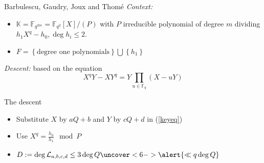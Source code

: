 \documentclass[xcolor=x11names,compress]{beamer}
\theoremstyle{break}
\theoremstyle{sc}
\theoremstyle{definition}
\theoremstyle{remark}
\begin{document}
\begin{frame}{Barbulescu, Gaudry, Joux and Thomé}
  \emph{Context:}
  \begin{itemize}
    \item $\mathbb{K}=\mathbb{F}_{q^{2m}}=\mathbb{F}_{q^2}[X]/(P)$ with $P$ irreducible
      polynomial of degree $m$ dividing $h_1X^q-h_0, \deg h_i\leq 2$.
    \item $F=\left\{  \text{degree one polynomials}\right\}\bigcup\left\{ h_1
      \right\}$ 
\end{itemize}
\emph{Descent:} based on the equation
 \begin{equation}
   X^qY - XY^q = Y\prod_{u\in\mathbb{F}_q}(X - uY)
   \label{keyeq}
 \end{equation}
\end{frame}

\begin{frame}{The descent}
  \begin{itemize}
   \item<1-> Substitute $X$ by $aQ + b$ and $Y$ by $cQ + d$ in (\ref{keyeq})
  \end{itemize}

  \begin{itemize}
    \item<3-> Use $X^q =\frac{h_0}{h_1}\mod P$
  \end{itemize}

  \begin{itemize}
    \item<5-> $D:=\deg\mathcal L_{a, b, c, d}\leq 3\deg
      Q\uncover<6->{\alert{\ll q\deg Q}}$   
  \end{itemize}

\end{frame}
\end{document}
